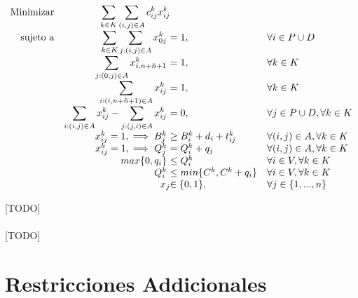 \documentclass{subfiles}
\begin{document}
      \begin{eqfloat}
				\begin{equation}
					\begin{array}{rr@{}ll}
  					\text{Minimizar} & \displaystyle\sum\limits_{k \in K}\sum\limits_{(i, j) \in A}  c_{ij}^{k}x_{ij}^{k} &                 & \\
						\text{sujeto a}	 & \displaystyle\sum\limits_{k \in K}\sum\limits_{j: (i, j) \in A} x_{0j}^{k} \ &= 1,                      & \forall i \in P \cup D \\
                             & \displaystyle\sum\limits_{j: (0, j) \in A} x_{i,n+\tilde{n} + 1}^{k}  \ &= 1, 	                          & \forall k \in K \\
                             & \displaystyle\sum\limits_{i: (i, n + \tilde{n} + 1) \in A} x_{ij}^{k} \ &= 1, 	                          & \forall k \in K \\
                             & \displaystyle\sum\limits_{i: (i, j) \in A} x_{ij}^{k} - \sum\limits_{j: (j, i) \in A} x_{ij}^{k} \ &= 0, & \forall j \in P \cup D, \forall k \in K \\
                             & x_{ij}^{k} = 1, \implies B_{j}^{k} \ &\geq B_{i}^{k} + d_{i} + t_{ij}^{k} 	                          & \forall (i, j) \in A, \forall k \in K \\
                             & x_{ij}^{k} = 1, \implies Q_{j}^{k} \ &= Q_{i}^{k} + q_{j} 	                          & \forall (i, j) \in A, \forall k \in K \\
                             & max\{0, q_{i}\} \ &\leq Q_{i}^k 	                          & \forall i \in V, \forall k \in K \\
                             & Q_{i}^k \ &\leq min\{C^{k}, C^{k} + q_{i}\} 	                          & \forall i \in V, \forall k \in K \\
														 &                               	x_{j} 	&\in \{0,1\}, 	                 & \forall j \in \{1,...,n\} \\
					\end{array}
				\end{equation}
				\caption{[TODO]}
				\label{eq:basic_formulation}
			\end{eqfloat}

      \paragraph{}
      [TODO]

    \section{Restricciones Addicionales}
    \label{sec:formulation_aditional_restrictions}
\end{document}
